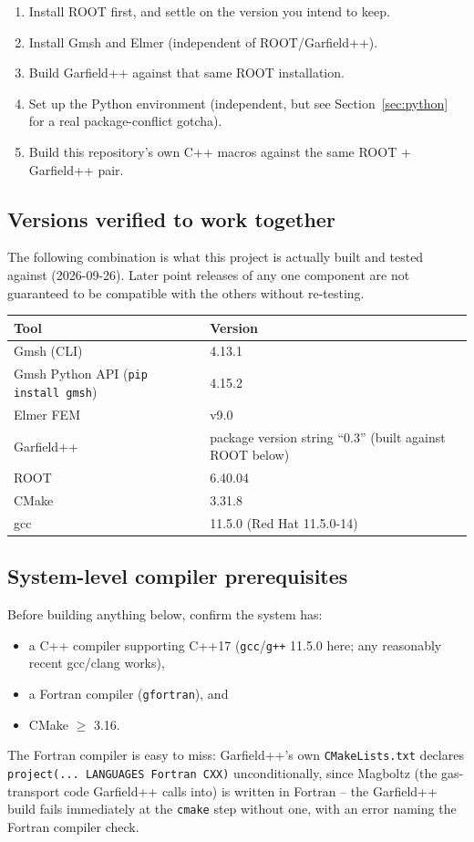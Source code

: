 \documentclass[11pt]{article}
\begin{document}
\begin{enumerate}
  \item Install ROOT first, and settle on the version you intend to keep.
  \item Install Gmsh and Elmer (independent of ROOT/Garfield++).
  \item Build Garfield++ against that same ROOT installation.
  \item Set up the Python environment (independent, but see
    Section~\ref{sec:python} for a real package-conflict gotcha).
  \item Build this repository's own C++ macros against the same
    ROOT + Garfield++ pair.
\end{enumerate}

\subsection{Versions verified to work together}

The following combination is what this project is actually built and
tested against (2026-09-26). Later point releases of any one component
are not guaranteed to be compatible with the others without re-testing.

\begin{table}[h]
\centering
\begin{tabular}{@{}p{6.5cm}p{5cm}@{}}
\toprule
Tool & Version \\
\midrule
Gmsh (CLI) & 4.13.1 \\
Gmsh Python API (\texttt{pip install gmsh}) & 4.15.2 \\
Elmer FEM & v9.0 \\
Garfield++ & package version string ``0.3'' (built against ROOT below) \\
ROOT & 6.40.04 \\
CMake & 3.31.8 \\
gcc & 11.5.0 (Red Hat 11.5.0-14) \\
\bottomrule
\end{tabular}
\end{table}

\subsection{System-level compiler prerequisites}

Before building anything below, confirm the system has:
\begin{itemize}
  \item a C++ compiler supporting C++17 (\texttt{gcc}/\texttt{g++} 11.5.0
    here; any reasonably recent gcc/clang works),
  \item a Fortran compiler (\texttt{gfortran}), and
  \item CMake $\geq$ 3.16.
\end{itemize}
The Fortran compiler is easy to miss: Garfield++'s own
\texttt{CMakeLists.txt} declares \texttt{project(... LANGUAGES Fortran
CXX)} unconditionally, since Magboltz (the gas-transport code Garfield++
calls into) is written in Fortran -- the Garfield++ build fails
immediately at the \texttt{cmake} step without one, with an error
naming the Fortran compiler check.
\end{document}
